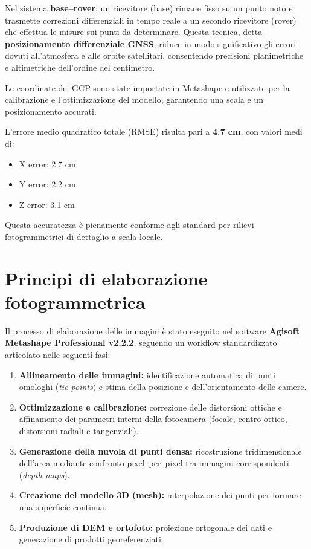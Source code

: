 \documentclass[9pt,a4paper,twocolumn,twoside]{tau-class/tau}
\begin{document}
Nel sistema \textbf{base–rover}, un ricevitore (base) rimane fisso su un punto noto e trasmette correzioni differenziali in tempo reale a un secondo ricevitore (rover) che effettua le misure sui punti da determinare. 
Questa tecnica, detta \textbf{posizionamento differenziale GNSS}, riduce in modo significativo gli errori dovuti all’atmosfera e alle orbite satellitari, consentendo precisioni planimetriche e altimetriche dell’ordine del centimetro.

Le coordinate dei GCP sono state importate in Metashape e utilizzate per la calibrazione e l’ottimizzazione del modello, garantendo una scala e un posizionamento accurati.  

L’errore medio quadratico totale (RMSE) risulta pari a \textbf{4.7 cm}, con valori medi di:
\begin{itemize}
    \item X error: 2.7 cm
    \item Y error: 2.2 cm
    \item Z error: 3.1 cm
\end{itemize}

Questa accuratezza è pienamente conforme agli standard per rilievi fotogrammetrici di dettaglio a scala locale.


\section*{Principi di elaborazione fotogrammetrica}

Il processo di elaborazione delle immagini è stato eseguito nel software \textbf{Agisoft Metashape Professional v2.2.2}, seguendo un workflow standardizzato articolato nelle seguenti fasi:

\begin{enumerate}
    \item \textbf{Allineamento delle immagini:} identificazione automatica di punti omologhi (\textit{tie points}) e stima della posizione e dell’orientamento delle camere.
    \item \textbf{Ottimizzazione e calibrazione:} correzione delle distorsioni ottiche e affinamento dei parametri interni della fotocamera (focale, centro ottico, distorsioni radiali e tangenziali).
    \item \textbf{Generazione della nuvola di punti densa:} ricostruzione tridimensionale dell’area mediante confronto pixel–per–pixel tra immagini corrispondenti (\textit{depth maps}).
    \item \textbf{Creazione del modello 3D (mesh):} interpolazione dei punti per formare una superficie continua.
    \item \textbf{Produzione di DEM e ortofoto:} proiezione ortogonale dei dati e generazione di prodotti georeferenziati.
\end{enumerate}
\end{document}
